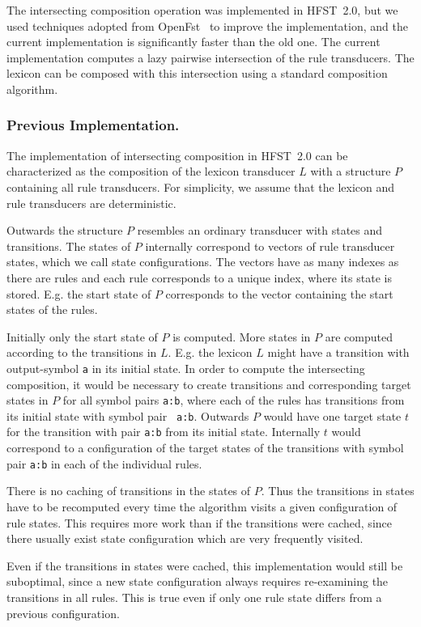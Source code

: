 \documentclass{llncs}
\begin{document}
The intersecting composition operation was implemented in HFST~2.0, but
we used techniques adopted from OpenFst~\cite{openfst/2007} to improve
the implementation, and the current implementation is significantly
faster than the old one. The current implementation computes a lazy
pairwise intersection of the rule transducers. The lexicon can be
composed with this intersection using a standard composition
algorithm.

\subsubsection{Previous Implementation.}
The implementation of intersecting composition in HFST~2.0 can be
characterized as the composition of the lexicon transducer $L$ with a
structure $P$ containing all rule transducers. For simplicity,
we assume that the lexicon and rule transducers are deterministic.

Outwards the structure $P$ resembles an ordinary transducer with
states and transitions. The states of $P$ internally correspond to
vectors of rule transducer states, which we call state
configurations. The vectors have as many indexes as there are rules
and each rule corresponds to a unique index, where its state is
stored. E.g. the start state of $P$ corresponds to the vector
containing the start states of the rules.

Initially only the start state of $P$ is computed. More states in $P$
are computed according to the transitions in $L$. E.g. the lexicon $L$
might have a transition with output-symbol {\tt a} in its initial
state. In order to compute the intersecting composition, it would be
necessary to create transitions and corresponding target states in $P$
for all symbol pairs {\tt a:b}, where each of the rules has
transitions from its initial state with symbol pair {\tt
  a:b}. Outwards $P$ would have one target state $t$ for the
transition with pair {\tt a:b} from its initial state. Internally $t$
would correspond to a configuration of the target states of the
transitions with symbol pair {\tt a:b} in each of the individual rules.

There is no caching of transitions in the states of $P$. Thus the
transitions in states have to be recomputed every time the algorithm
visits a given configuration of rule states. This requires more work
than if the transitions were cached, since there usually exist state
configuration which are very frequently visited.

Even if the transitions in states were cached, this implementation
would still be suboptimal, since a new state configuration always
requires re-examining the transitions in all rules. This is true even
if only one rule state differs from a previous configuration.
\end{document}
